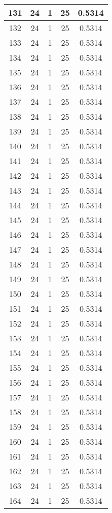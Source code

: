 \documentclass[letterpaper, 12pt]{article}
\begin{document}
\begin{longtable}{|c|c|c|c|c|}
\hline
131 & 24 & 1 & 25 & 0.5314 \\
\hline
132 & 24 & 1 & 25 & 0.5314 \\
\hline
133 & 24 & 1 & 25 & 0.5314 \\
\hline
134 & 24 & 1 & 25 & 0.5314 \\
\hline
135 & 24 & 1 & 25 & 0.5314 \\
\hline
136 & 24 & 1 & 25 & 0.5314 \\
\hline
137 & 24 & 1 & 25 & 0.5314 \\
\hline
138 & 24 & 1 & 25 & 0.5314 \\
\hline
139 & 24 & 1 & 25 & 0.5314 \\
\hline
140 & 24 & 1 & 25 & 0.5314 \\
\hline
141 & 24 & 1 & 25 & 0.5314 \\
\hline
142 & 24 & 1 & 25 & 0.5314 \\
\hline
143 & 24 & 1 & 25 & 0.5314 \\
\hline
144 & 24 & 1 & 25 & 0.5314 \\
\hline
145 & 24 & 1 & 25 & 0.5314 \\
\hline
146 & 24 & 1 & 25 & 0.5314 \\
\hline
147 & 24 & 1 & 25 & 0.5314 \\
\hline
148 & 24 & 1 & 25 & 0.5314 \\
\hline
149 & 24 & 1 & 25 & 0.5314 \\
\hline
150 & 24 & 1 & 25 & 0.5314 \\
\hline
151 & 24 & 1 & 25 & 0.5314 \\
\hline
152 & 24 & 1 & 25 & 0.5314 \\
\hline
153 & 24 & 1 & 25 & 0.5314 \\
\hline
154 & 24 & 1 & 25 & 0.5314 \\
\hline
155 & 24 & 1 & 25 & 0.5314 \\
\hline
156 & 24 & 1 & 25 & 0.5314 \\
\hline
157 & 24 & 1 & 25 & 0.5314 \\
\hline
158 & 24 & 1 & 25 & 0.5314 \\
\hline
159 & 24 & 1 & 25 & 0.5314 \\
\hline
160 & 24 & 1 & 25 & 0.5314 \\
\hline
161 & 24 & 1 & 25 & 0.5314 \\
\hline
162 & 24 & 1 & 25 & 0.5314 \\
\hline
163 & 24 & 1 & 25 & 0.5314 \\
\hline
164 & 24 & 1 & 25 & 0.5314 \\

\end{longtable}
\end{document}
